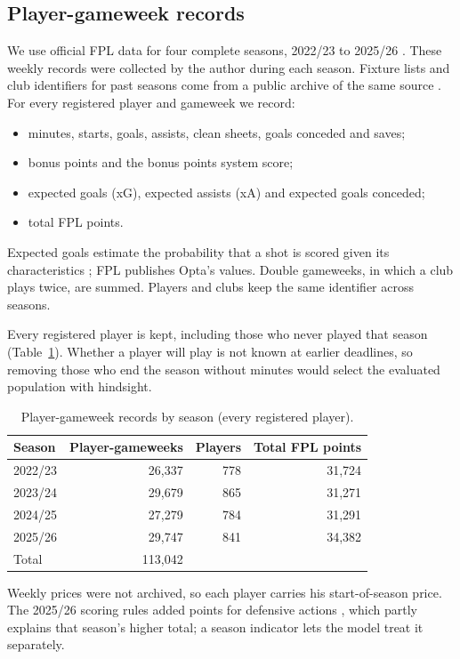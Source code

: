 \documentclass[11pt,a4paper]{article}
\begin{document}
\subsection{Player-gameweek records}
We use official FPL data for four complete seasons, 2022/23 to 2025/26 \citep{fplapi}. These
weekly records were collected by the author during each season. Fixture lists and club identifiers
for past seasons come from a public archive of the same source \citep{anandfpl}. For every
registered player and gameweek we record:
\begin{itemize}
  \item minutes, starts, goals, assists, clean sheets, goals conceded and saves;
  \item bonus points and the bonus points system score;
  \item expected goals (xG), expected assists (xA) and expected goals conceded;
  \item total FPL points.
\end{itemize}
Expected goals estimate the probability that a shot is scored given its characteristics
\citep{rathke2017}; FPL publishes Opta's values. Double gameweeks, in which a club plays twice, are
summed. Players and clubs keep the same identifier across seasons.

Every registered player is kept, including those who never played that season
(Table~\ref{tab:data}). Whether a player will play is not known at earlier deadlines, so removing
those who end the season without minutes would select the evaluated population with hindsight.

\begin{table}[ht]
\centering
\caption{Player-gameweek records by season (every registered player).}
\label{tab:data}
\begin{tabular}{lrrr}
\toprule
Season & Player-gameweeks & Players & Total FPL points \\
\midrule
2022/23 & 26{,}337 & 778 & 31{,}724 \\
2023/24 & 29{,}679 & 865 & 31{,}271 \\
2024/25 & 27{,}279 & 784 & 31{,}291 \\
2025/26 & 29{,}747 & 841 & 34{,}382 \\
\midrule
Total   & 113{,}042 &    &           \\
\bottomrule
\end{tabular}
\end{table}

Weekly prices were not archived, so each player carries his start-of-season price. The 2025/26
scoring rules added points for defensive actions \citep{fplrules}, which partly explains that
season's higher total; a season indicator lets the model treat it separately.
\end{document}
